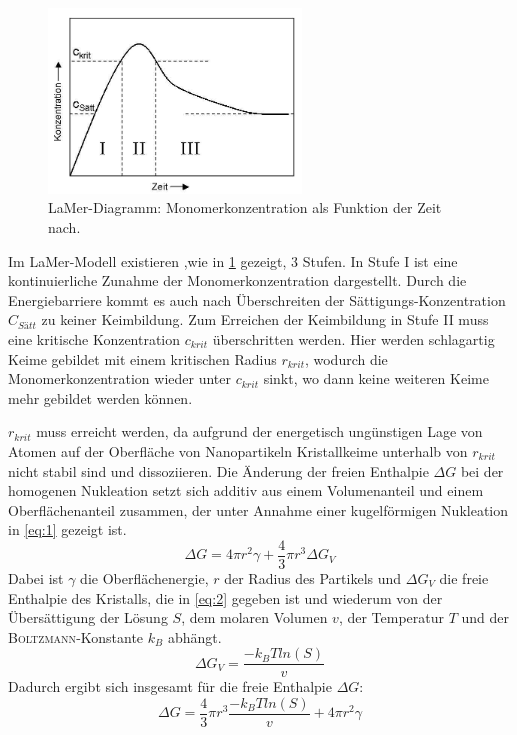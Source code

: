 	\begin{figure}[H]
		\centering
		\includegraphics[width=0.6\textwidth]{Bilder/LaMer} 	
		\caption{LaMer-Diagramm: Monomerkonzentration als Funktion der Zeit nach.\autocite{Lamer1950}}
		\label{fig:LaMer}
	\end{figure}

	Im LaMer-Modell existieren ,wie in \cref{fig:LaMer} gezeigt, 3 Stufen. 
	In Stufe I ist eine kontinuierliche Zunahme der Monomerkonzentration dargestellt.
	Durch die Energiebarriere kommt es auch nach Überschreiten der Sättigungs-Konzentration $C_{Sätt}$ zu keiner Keimbildung.
	Zum Erreichen der Keimbildung in Stufe II muss eine kritische Konzentration $c_{krit}$ überschritten werden.
	Hier werden schlagartig Keime gebildet mit einem kritischen Radius $r_{krit}$, wodurch die Monomerkonzentration wieder unter $c_{krit}$ sinkt, wo dann keine weiteren Keime mehr gebildet werden können.
	
	$r_{krit}$ muss erreicht werden, da aufgrund der energetisch ungünstigen Lage von Atomen auf der Oberfläche von Nanopartikeln Kristallkeime unterhalb von $r_{krit}$ nicht stabil sind und dissoziieren.
	Die Änderung der freien Enthalpie $\Delta G$ bei der homogenen Nukleation setzt sich additiv aus einem Volumenanteil und einem Oberflächenanteil zusammen, der unter Annahme einer kugelförmigen Nukleation in \cref{eq:1} gezeigt ist.\autocite{Thanh2014}
	\begin{equation}
	\label{eq:1}
	\Delta G = 4 \pi r^2 \gamma + \dfrac{4}{3} \pi r^3 \Delta G_V
	\end{equation}
	Dabei ist $\gamma$ die Oberflächenergie, $r$ der Radius des Partikels und $\Delta G_V$ die freie Enthalpie des Kristalls, die in \cref{eq:2} gegeben ist und wiederum von der Übersättigung der Lösung $S$, dem molaren Volumen $v$, der Temperatur $T$ und der \textsc{Boltzmann}-Konstante $k_B$ abhängt.
	\begin{equation}
	\label{eq:2}
	\Delta G_V = \dfrac{-k_B T ln(S)}{v}
	\end{equation}
	Dadurch ergibt sich insgesamt für die freie Enthalpie $\Delta G$:
	\begin{equation}
	\Delta G = \dfrac{4}{3} \pi r^3 \dfrac{-k_B T ln(S)}{v}+4 \pi r^2 \gamma
	\end{equation}
	 
